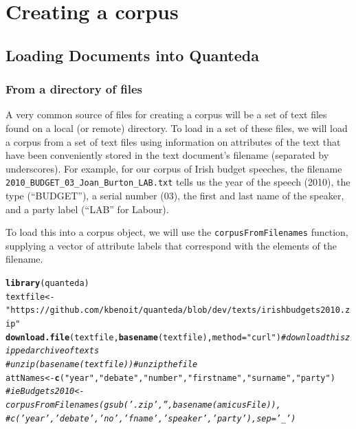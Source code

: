 \documentclass[11pt]{article}\usepackage[]{graphicx}\usepackage[]{color}
\makeatletter
\newcommand{\hlstr}[1]{\textcolor[rgb]{0.192,0.494,0.8}{#1}}%
\newcommand{\hlcom}[1]{\textcolor[rgb]{0.678,0.584,0.686}{\textit{#1}}}%
\newcommand{\hlstd}[1]{\textcolor[rgb]{0.345,0.345,0.345}{#1}}%
\newcommand{\hlkwb}[1]{\textcolor[rgb]{0.69,0.353,0.396}{#1}}%
\newcommand{\hlkwc}[1]{\textcolor[rgb]{0.333,0.667,0.333}{#1}}%
\newcommand{\hlkwd}[1]{\textcolor[rgb]{0.737,0.353,0.396}{\textbf{#1}}}%
\newenvironment{kframe}{%
 \def\at@end@of@kframe{}%
 \ifinner\ifhmode%
  \def\at@end@of@kframe{\end{minipage}}%
  \begin{minipage}{\columnwidth}%
 \fi\fi%
 \def\FrameCommand##1{\hskip\@totalleftmargin \hskip-\fboxsep
 \colorbox{shadecolor}{##1}\hskip-\fboxsep
     \hskip-\linewidth \hskip-\@totalleftmargin \hskip\columnwidth}%
 \MakeFramed {\advance\hsize-\width
   \@totalleftmargin\z@ \linewidth\hsize
   \@setminipage}}%
 {\par\unskip\endMakeFramed%
 \at@end@of@kframe}
\newenvironment{knitrout}{}{} %
\makeatother
\begin{document}
\section{Creating a corpus}

\subsection{Loading Documents into Quanteda}

\subsubsection{From a directory of files}

A very common source of files for creating a corpus will be a set of
text files found on a local (or remote) directory.  To load in a set
of these files, we will load a corpus from a set of text files using
information on attributes of the text that have been conveniently
stored in the text document's filename (separated by underscores).
For example, for our corpus of Irish budget speeches, the filename
\texttt{2010\_BUDGET\_03\_Joan\_Burton\_LAB.txt} tells us the year of
the speech (2010), the type (``BUDGET''), a serial number (03), the
first and last name of the speaker, and a party label (``LAB'' for
Labour).

To load this into a corpus object, we will use the
\texttt{corpusFromFilenames} function, supplying a vector of attribute
labels that correspond with the elements of the filename.

\begin{knitrout}
\color{fgcolor}\begin{kframe}
\begin{alltt}
\hlkwd{library}\hlstd{(quanteda)}
\hlstd{textfile} \hlkwb{<-} \hlstr{"https://github.com/kbenoit/quanteda/blob/dev/texts/irishbudgets2010.zip"}
\hlkwd{download.file}\hlstd{(textfile,} \hlkwd{basename}\hlstd{(textfile),} \hlkwc{method} \hlstd{=} \hlstr{"curl"}\hlstd{)}  \hlcom{# download this zipped archive of texts}
\hlcom{# unzip(basename(textfile)) # unzip the file}
\hlstd{attNames} \hlkwb{<-} \hlkwd{c}\hlstd{(}\hlstr{"year"}\hlstd{,} \hlstr{"debate"}\hlstd{,} \hlstr{"number"}\hlstd{,} \hlstr{"firstname"}\hlstd{,} \hlstr{"surname"}\hlstd{,} \hlstr{"party"}\hlstd{)}
\hlcom{# ieBudgets2010 <- corpusFromFilenames(gsub('.zip', '', basename(amicusFile)),}
\hlcom{# c('year', 'debate', 'no', 'fname', 'speaker', 'party'), sep='_')}
\end{alltt}
\end{kframe}
\end{knitrout}
\end{document}
